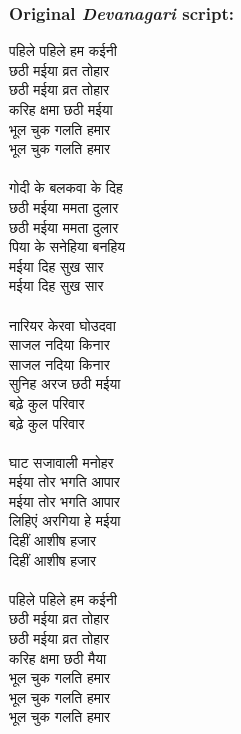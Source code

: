 \documentclass[17pt]{extarticle}
\begin{document}
\subsubsection*{\textbf{Original \emph{Devanagari} script:}}
\begin{hindi}
पहिले पहिले हम कईनी\\
छठी मईया व्रत तोहार\\
छठी मईया व्रत तोहार\\
करिह क्षमा छठी मईया\\
भूल चुक गलति हमार\\
भूल चुक गलति हमार\\\\
गोदी के बलकवा के दिह\\
छठी मईया ममता दुलार\\
छठी मईया ममता दुलार\\
पिया के सनेहिया बनहिय\\
मईया दिह सुख सार\\
मईया दिह सुख सार\\\\
नारियर केरवा घोउदवा\\
साजल नदिया किनार\\
साजल नदिया किनार\\
सुनिह अरज छठी मईया\\
बढ़े कुल परिवार\\
बढ़े कुल परिवार\\\\
घाट सजावाली मनोहर\\
मईया तोर भगति आपार\\
मईया तोर भगति आपार\\
लिहिएं अरगिया हे मईया\\
दिहीं आशीष हजार\\
दिहीं आशीष हजार\\\\
पहिले पहिले हम कईनी\\
छठी मईया व्रत तोहार\\
छठी मईया व्रत तोहार\\
करिह क्षमा छठी मैया\\
भूल चुक गलति हमार\\
भूल चुक गलति हमार\\
भूल चुक गलति हमार\\
\end{hindi}
\end{document}
